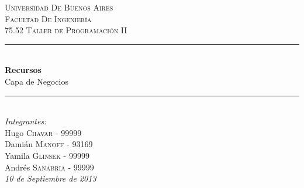 \documentclass{article}
\begin{document}
\begin{titlepage}

\newcommand{\HRule}{\rule{\linewidth}{0.5mm}} %

\center %
 

\textsc{\LARGE Universidad De Buenos Aires}\\[1.5cm] %
\textsc{\Large Facultad De Ingeniería}\\[0.5cm] %
\textsc{\large 75.52 Taller de Programaci\'on II}\\[0.5cm] %


\HRule \\[0.4cm]
{ \huge \bfseries Recursos}\\ Capa de Negocios\\[0.4cm] %
\HRule \\[1.5cm]
 

\Large \emph{Integrantes:}\\

Hugo \textsc{Chavar} - 99999\\ %
Dami\'an \textsc{Manoff} - 93169\\ %
Yamila \textsc{Glinsek} - 99999\\ %
Andr\'es \textsc{Sanabria} - 99999\\[5cm] %



{\large \text \em {10 de Septiembre de 2013}}\\[3cm] %
 

\vfill %

\end{titlepage}
\end{document}
